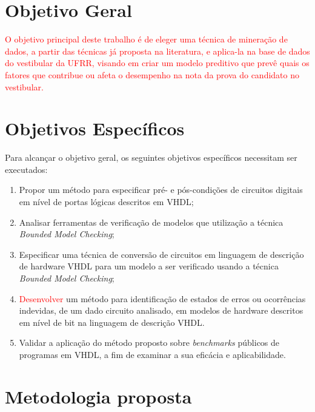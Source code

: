 
\section{Objetivo Geral}

\par
\textcolor{red}{O objetivo principal deste trabalho é de eleger uma técnica de mineração de dados, a partir das técnicas já proposta na literatura, e aplica-la na base de dados do vestibular da UFRR, visando em criar um modelo preditivo que prevê quais os fatores que contribue ou afeta o desempenho na nota da prova do candidato no vestibular.}



\section{Objetivos Específicos}

Para alcançar o objetivo geral, os seguintes objetivos específicos necessitam ser executados:


\begin{enumerate}
  \item Propor um método para especificar pré- e pós-condições de circuitos digitais em nível de portas lógicas descritos em VHDL;
  \item Analisar ferramentas de verificação de modelos que utilização a técnica \textit{Bounded Model Checking};
  \item Especificar uma técnica de conversão de circuitos em linguagem de descrição de hardware VHDL para um modelo a ser verificado usando a técnica \textit{Bounded Model Checking};
   \item \textcolor{red}{Desenvolver} um método para identificação de estados de erros ou ocorrências indevidas, de um dado circuito analisado, em modelos de hardware descritos em nível de bit na linguagem de descrição VHDL.
  \item Validar a aplicação do método proposto sobre \textit{benchmarks} públicos de programas em VHDL, a fim de examinar a sua eficácia e aplicabilidade.
\end{enumerate}

\section{Metodologia proposta}

